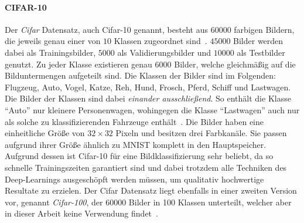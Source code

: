 \paragraph{CIFAR-10}
\label{cifar_10}

Der \emph{\gls{Cifar}} Datensatz, auch \gls{Cifar}-10 genannt, besteht aus $60000$ farbigen Bildern, die jeweils genau einer von $10$ Klassen zugeordnet sind~\cite{cifar_10}.
$45000$ Bilder werden dabei als Trainingsbilder, $5000$ als Validierungsbilder und $10000$ als Testbilder genutzt.
Zu jeder Klasse existieren genau $6000$ Bilder, welche gleichmäßig auf die Bilduntermengen aufgeteilt sind.
Die Klassen der Bilder sind im Folgenden: Flugzeug, Auto, Vogel, Katze, Reh, Hund, Frosch, Pferd, Schiff und Lastwagen.
Die Bilder der Klassen sind dabei \emph{einander ausschließend}.
So enthält die Klasse \enquote{Auto} nur kleinere Personenwagen, wohingegen die Klasse \enquote{Lastwagen} auch nur als solche zu klassifizierenden Fahrzeuge enthält~\cite{cifar_10}.
Die Bilder haben eine einheitliche Größe von $32 \times 32$ Pixeln und besitzen drei Farbkanäle.
Sie passen aufgrund ihrer Größe ähnlich zu \gls{MNIST} komplett in den Hauptspeicher.
Aufgrund dessen ist \gls{Cifar}-10 für eine Bildklassifizierung sehr beliebt, da so schnelle Trainingszeiten garantiert sind und dabei trotzdem alle Techniken des Deep-Learnings ausgeschöpft werden müssen, um qualitativ hochwertige Resultate zu erzielen.
Der \gls{Cifar} Datensatz liegt ebenfalls in einer zweiten Version vor, genannt \emph{\gls{Cifar}-100}, der 60000 Bilder in 100 Klassen unterteilt, welcher aber in dieser Arbeit keine Verwendung findet~\cite{cifar_10}.

